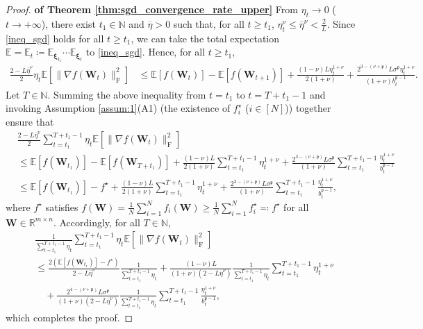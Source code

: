 \documentclass[twoside,11pt]{article}
\begin{document}
\begin{proof}
\textbf{of Theorem \ref{thm:sgd_convergence_rate_upper}} From $\eta_t \to 0$ ($t \to + \infty$), there exist $t_1 \in \mathbb{N}$ and $\overline{\eta} > 0$ such that, for all $t \geq t_1$, $\eta_t^\nu \leq \overline{\eta}^\nu < \frac{2}{L}$. Since \eqref{ineq_sgd} holds for all $t \geq t_1$, we can take the total expectation $\mathbb{E} = \mathbb{E}_t \coloneqq \mathbb{E}_{\bm{\xi}_{t_1}} \cdots \mathbb{E}_{\bm{\xi}_{t}}$ to \eqref{ineq_sgd}. Hence, for all $t \geq t_1$,
\begin{align*}
\frac{2 - L \overline{\eta}^\nu}{2} \eta_t 
\mathbb{E} [\| \nabla f (\bm{W}_t)\|_{\mathrm{F}}^2]
&\leq 
\mathbb{E} [f(\bm{W}_t)] 
-
\mathbb{E} [ f(\bm{W}_{t+1})]
+ \frac{(1 - \nu) L \eta_t^{1 + \nu}}{2 (1 + \nu)}
+ \frac{2^{3 - (\nu + \mathfrak{p})} L \sigma^{\mathfrak{p}} \eta_t^{1 + \nu}}{(1 + \nu) b_t^{\mathfrak{p}-1}}.
\end{align*}
Let $T \in \mathbb{N}$. Summing the above inequality from $t = t_1$ to $t = T + t_1 -1$ and invoking Assumption \ref{assum:1}(A1) (the existence of $f_i^\star$ ($i\in [N]$)) together ensure that
\begin{align*}
&\frac{2 - L \overline{\eta}^\nu}{2} \sum_{t= t_1}^{T + t_1 -1} \eta_t 
\mathbb{E} [\| \nabla f (\bm{W}_t)\|_{\mathrm{F}}^2]\\
&\leq 
\mathbb{E} [f(\bm{W}_{t_1})] 
-
\mathbb{E} [ f(\bm{W}_{T + t_1})]
+ \frac{(1 - \nu) L}{2 (1 + \nu)} \sum_{t= t_1}^{T + t_1 -1} \eta_t^{1 + \nu}
+ \frac{2^{3 - (\nu + \mathfrak{p})} L \sigma^{\mathfrak{p}}}{(1 + \nu)} \sum_{t= t_1}^{T + t_1 -1} \frac{\eta_t^{1 + \nu}}{b_t^{\mathfrak{p}-1}}\\
&\leq 
\mathbb{E} [f(\bm{W}_{t_1})] 
-
f^{\star}
+ \frac{(1 - \nu) L}{2 (1 + \nu)} \sum_{t= t_1}^{T + t_1 -1} \eta_t^{1 + \nu}
+ \frac{2^{3 - (\nu + \mathfrak{p})} L \sigma^{\mathfrak{p}}}{(1 + \nu)} \sum_{t= t_1}^{T + t_1 -1} \frac{\eta_t^{1 + \nu}}{b_t^{\mathfrak{p}-1}},
\end{align*}
where $f^\star$ satisfies $f(\bm{W}) = \frac{1}{N} \sum_{i=1}^N f_i (\bm{W}) \geq \frac{1}{N} \sum_{i=1}^N f_i^\star \eqqcolon f^\star$ for all $\bm{W} \in \mathbb{R}^{m \times n}$. Accordingly, for all $T \in \mathbb{N}$,
\begin{align*}
&\frac{1}{\sum_{t= t_1}^{T + t_1 -1} \eta_t}
\sum_{t= t_1}^{T + t_1 -1} \eta_t 
\mathbb{E} [\| \nabla f (\bm{W}_t)\|_{\mathrm{F}}^2]\\
&\leq
\frac{2(\mathbb{E} [f(\bm{W}_{t_1})] - f^{\star})}{2 - L \overline{\eta}^\nu}
\frac{1}{\sum_{t= t_1}^{T + t_1 -1} \eta_t}
+ \frac{(1 - \nu) L}{(1 + \nu)(2 - L \overline{\eta}^\nu)} \frac{1}{\sum_{t= t_1}^{T + t_1 -1} \eta_t} \sum_{t= t_1}^{T + t_1 -1} \eta_t^{1 + \nu}\\
&\quad + \frac{2^{4 - (\nu + \mathfrak{p})} L \sigma^{\mathfrak{p}}}{(1 + \nu)(2 - L \overline{\eta}^\nu)} \frac{1}{\sum_{t= t_1}^{T + t_1 -1} \eta_t} \sum_{t= t_1}^{T + t_1 -1} \frac{\eta_t^{1 + \nu}}{b_t^{\mathfrak{p}-1}},
\end{align*}
which completes the proof.
\end{proof}
\end{document}
